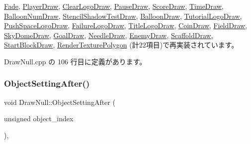 \mbox{\hyperlink{class_fade_ac2a47819e1390abcae3259bcb42bddf5}{Fade}}, \mbox{\hyperlink{class_player_draw_ad79a0fbeb618e0913822b573e5d0be68}{Player\+Draw}}, \mbox{\hyperlink{class_clear_logo_draw_a9af656c0a8ebfb5fa133a0983add6ffd}{Clear\+Logo\+Draw}}, \mbox{\hyperlink{class_pause_draw_a6d2ea46c8c17f33684b3eaa42913204b}{Pause\+Draw}}, \mbox{\hyperlink{class_score_draw_af013abb96136825e71d4fee06529fc69}{Score\+Draw}}, \mbox{\hyperlink{class_time_draw_a6a7a80dfac7c27fab8476655348be36a}{Time\+Draw}}, \mbox{\hyperlink{class_balloon_num_draw_a5c31e6bfc16a41a186e47d57b31b7759}{Balloon\+Num\+Draw}}, \mbox{\hyperlink{class_stencil_shadow_test_draw_a65be72e71cd12cacf315b0364c12c3e3}{Stencil\+Shadow\+Test\+Draw}}, \mbox{\hyperlink{class_balloon_draw_ad00ffd9c5316e08938259e1f1116812f}{Balloon\+Draw}}, \mbox{\hyperlink{class_tutorial_logo_draw_a53fc4b1b23c7f9e249600be67510f944}{Tutorial\+Logo\+Draw}}, \mbox{\hyperlink{class_push_space_logo_draw_a7ad3fe53d9bda4ea16c958bc102ff54e}{Push\+Space\+Logo\+Draw}}, \mbox{\hyperlink{class_failure_logo_draw_a718d587edcabb1feea72153a79a65176}{Failure\+Logo\+Draw}}, \mbox{\hyperlink{class_title_logo_draw_a9f70fb70639510908f4e07ee14667e30}{Title\+Logo\+Draw}}, \mbox{\hyperlink{class_coin_draw_ad0f5da5cfb896541fd59b1ab4a8593d1}{Coin\+Draw}}, \mbox{\hyperlink{class_field_draw_a4287d2ce33033b2413c1d3a81b173373}{Field\+Draw}}, \mbox{\hyperlink{class_sky_dome_draw_a5b82e8b650a20dbc0b7ed720d1fb7fab}{Sky\+Dome\+Draw}}, \mbox{\hyperlink{class_goal_draw_a3eb0a555fa2db9d2c1253018ea65796e}{Goal\+Draw}}, \mbox{\hyperlink{class_needle_draw_a8b170b4ed205bba8ca991a4dc7779844}{Needle\+Draw}}, \mbox{\hyperlink{class_enemy_draw_aa1659c35fa757db6a6cf07e26ad9ddfb}{Enemy\+Draw}}, \mbox{\hyperlink{class_scaffold_draw_a707921e63d07543692e8e9fd1b2dcc36}{Scaffold\+Draw}}, \mbox{\hyperlink{class_start_block_draw_aae788a1d8d023cf387839c4bd9b74a1c}{Start\+Block\+Draw}}, \mbox{\hyperlink{class_render_texture_polygon_a623a232ed09b2bfca8c3557075044aac}{Render\+Texture\+Polygon}} (計22項目)で再実装されています。



 Draw\+Null.\+cpp の 106 行目に定義があります。

\mbox{\label{class_draw_null_a5b4466ae238e46cffe4a10fd253caf17}} 
\subsubsection{\texorpdfstring{Object\+Setting\+After()}{ObjectSettingAfter()}}
{\footnotesize\ttfamily void Draw\+Null\+::\+Object\+Setting\+After (\begin{DoxyParamCaption}\item[{unsigned}]{object\+\_\+index }\end{DoxyParamCaption})\hspace{0.3cm}{\ttfamily [override]}, {\ttfamily [virtual]}}




